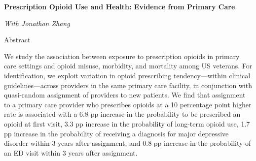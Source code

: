 \documentclass[letterpaper,11pt]{article}
\begin{document}
\Large{\textbf{Prescription Opioid Use and Health: Evidence from Primary Care}}

\small{\textit{With Jonathan Zhang}}


 \bigskip

Abstract

\medskip

We study the association between exposure to prescription opioids in primary care settings and opioid misuse, morbidity, and mortality among US veterans. For identification, we exploit variation in opioid prescribing tendency---within clinical guidelines---across providers in the same primary care facility, in conjunction with quasi-random assignment of providers to new patients. We find that assignment to a primary care provider who prescribes opioids at a 10 percentage point higher rate is associated with a 6.8 pp increase in the probability to be prescribed an opioid at first visit, 3.3 pp increase in the probability of long-term opioid use, 1.7 pp increase in the probability of receiving a diagnosis for major depressive disorder within 3 years after assignment, and 0.8 pp increase in the probability of an ED visit within 3 years after assignment.
\end{document}
